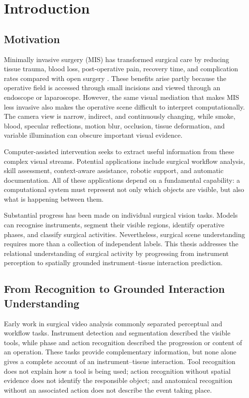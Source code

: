 \chapter{Introduction}
\label{chap:introduction}
\minitoc

\section{Motivation}
\label{sec:introduction-motivation}

Minimally invasive surgery (MIS) has transformed surgical care by reducing tissue trauma, blood loss, post-operative pain, recovery time, and complication rates compared with open surgery \cite{jaffray2005minimally}. These benefits arise partly because the operative field is accessed through small incisions and viewed through an endoscope or laparoscope. However, the same visual mediation that makes MIS less invasive also makes the operative scene difficult to interpret computationally. The camera view is narrow, indirect, and continuously changing, while smoke, blood, specular reflections, motion blur, occlusion, tissue deformation, and variable illumination can obscure important visual evidence.

Computer-assisted intervention seeks to extract useful information from these complex visual streams. Potential applications include surgical workflow analysis, skill assessment, context-aware assistance, robotic support, and automatic documentation. All of these applications depend on a fundamental capability: a computational system must represent not only which objects are visible, but also what is happening between them.

Substantial progress has been made on individual surgical vision tasks. Models can recognise instruments, segment their visible regions, identify operative phases, and classify surgical activities. Nevertheless, surgical scene understanding requires more than a collection of independent labels. This thesis addresses the relational understanding of surgical activity by progressing from instrument perception to spatially grounded instrument--tissue interaction prediction.

\section{From Recognition to Grounded Interaction Understanding}
\label{sec:introduction-from-recognition}

Early work in surgical video analysis commonly separated perceptual and workflow tasks. Instrument detection and segmentation described the visible tools, while phase and action recognition described the progression or content of an operation. These tasks provide complementary information, but none alone gives a complete account of an instrument--tissue interaction. Tool recognition does not explain how a tool is being used; action recognition without spatial evidence does not identify the responsible object; and anatomical recognition without an associated action does not describe the event taking place.

